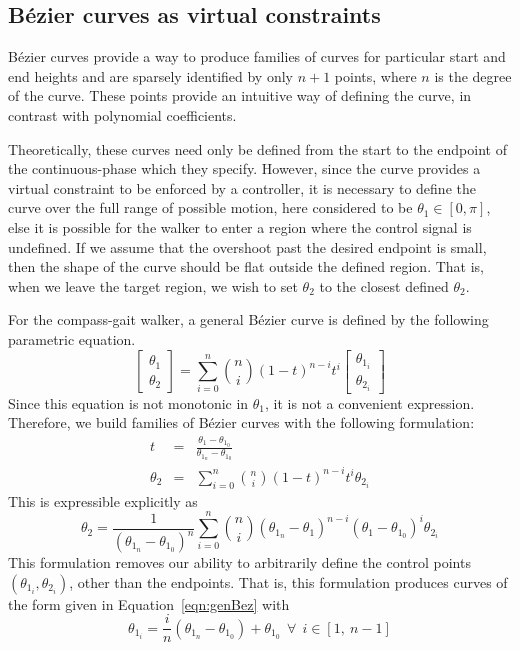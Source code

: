 \subsection{B{\'e}zier curves as virtual constraints}
Bézier curves provide a way to produce families of curves for particular start and end heights and are sparsely identified by only $n+1$ points, where $n$ is the degree of the curve. These points provide an intuitive way of defining the curve, in contrast with polynomial coefficients.
\par

Theoretically, these curves need only be defined from the start to the endpoint of the continuous-phase which they specify. However, since the curve provides a virtual constraint to be enforced by a controller, it is necessary to define the curve over the full range of possible motion, here considered to be $\theta_1 \in \left[0, \pi\right]$, else it is possible for the walker to enter a region where the control signal is undefined. If we assume that the overshoot past the desired endpoint is small, then the shape of the curve should be flat outside the defined region. That is, when we leave the target region, we wish to set $\theta_2$ to the closest defined $\theta_2$. \\ \par

For the compass-gait walker, a general Bézier curve is defined by the following parametric equation.
\begin{equation}
	\begin{bmatrix}
		\theta_1 \\ \theta_2
	\end{bmatrix}
	=
	\sum_{i=0}^{n}\binom{n}{i}\left(1-t\right)^{n-i}t^i
	\begin{bmatrix}
		\theta_{1_i} \\ \theta_{2_i}
	\end{bmatrix} \label{eqn:genBez}
\end{equation}
Since this equation is not monotonic in $\theta_1$, it is not a convenient expression. Therefore, we build families of Bézier curves with the following formulation:
\begin{eqnarray}
	t &=& \frac{\theta_1 - \theta_{1_0}}{\theta_{1_n} - \theta_{1_0}} \\
	\theta_2 &=& \sum_{i=0}^{n}\binom{n}{i}\left(1-t\right)^{n-i}t^i\theta_{2_i}
\end{eqnarray}
This is expressible explicitly as
\begin{equation}
	\theta_2 = \frac{1}{\left(\theta_{1_n} - \theta_{1_0}\right)^n}\sum_{i=0}^{n}\binom{n}{i}
		\left(\theta_{1_n} - \theta_1\right)^{n-i}
		\left(\theta_1 - \theta_{1_0}\right)^i\theta_{2_i} \label{eqn:expBez}
\end{equation}
This formulation removes our ability to arbitrarily define the control points $\left(\theta_{1_i}, \theta_{2_i}\right)$, other than the endpoints. That is, this formulation produces curves of the form given in Equation~\ref{eqn:genBez} with
\begin{equation}
	\theta_{1_i} = \frac{i}{n}\left(\theta_{1_n}-\theta_{1_0}\right) + \theta_{1_0} ~~
	\forall ~~ i \in \left[1,~n-1\right]
\end{equation}

